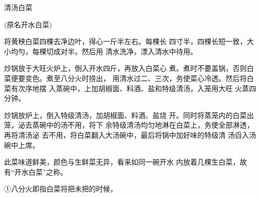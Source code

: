 \begin{recipe}{清汤白菜}

(原名开水白菜)

\ingredients


\cooking

\step 	将黄秧白菜四棵去净边叶，得心一斤半左右。每棵长 四寸半，四棵长短一致，大小均勻，每棵切成对半。然后用 清水洗净，漂入清水中待用。

\step 	炒锅放于大旺火炉上，倒入开水四斤，再放入白菜心 煮。煮时不要盖锅，否则白菜便要变色。煮至八分火时捞出， 用清水过二、三次，务使菜心冷透。然后将白菜有次序地摆 入蒸碗中，上加胡椒面、料酒、盐和特级清汤，入笼用大旺 火蒸四分钟。

\step 炒锅放炉上，倒入特级清汤，加胡椒面、料酒、盐烧 开。同时将蒸笼内的白菜出笼，泌去蒸碗中的汤不用，将下 余特级清汤均匀地淋在白菜上，务使全部淋透，再将清汤泌 去不用，将白菜翻入大汤碗中，最后将锅中加好味的特级清 汤舀入汤碗中上席。

\notes

此菜味道鲜美，颜色与生鲜菜无异，看来如同一碗开水 内放着几棵生白菜，故有“开水白菜”之称。

①八分火即指白菜将把未把的时候，

\end{recipe}

